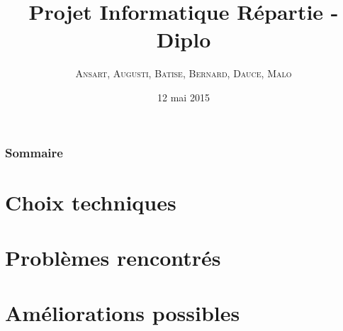 \documentclass[handout]{beamer}
\title{
	Projet Informatique Répartie - Diplo
}
\author{
	\textsc{Ansart}, \textsc{Augusti}, \textsc{Batise},
	\textsc{Bernard}, \textsc{Dauce}, \textsc{Malo}
}
\date{12 mai 2015}
\begin{document}
	\begin{frame}[plain]
		\titlepage
	\end{frame}

	\begin{frame}[plain]
		\frametitle{Sommaire}
		\tableofcontents
	\end{frame}

	\section{Choix techniques}
		

	\section{Problèmes rencontrés}
		

	\section{Améliorations possibles}
		
\end{document}
